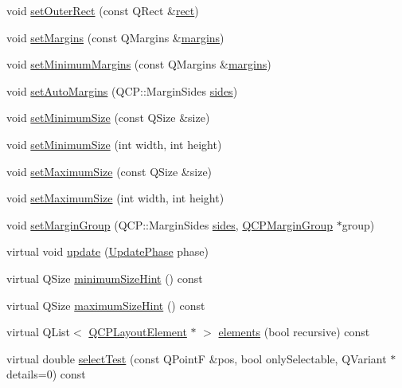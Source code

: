 \begin{DoxyCompactItemize}
\item 
void \hyperlink{class_q_c_p_layout_element_a38975ea13e36de8e53391ce41d94bc0f}{set\+Outer\+Rect} (const Q\+Rect \&\hyperlink{class_q_c_p_layout_element_affdfea003469aac3d0fac5f4e06171bc}{rect})
\item 
void \hyperlink{class_q_c_p_layout_element_a8f450b1f3f992ad576fce2c63d8b79cf}{set\+Margins} (const Q\+Margins \&\hyperlink{class_q_c_p_layout_element_a85ff977dfcced84eef32d9f819ec9543}{margins})
\item 
void \hyperlink{class_q_c_p_layout_element_a0a8a17abc16b7923159fcc7608f94673}{set\+Minimum\+Margins} (const Q\+Margins \&\hyperlink{class_q_c_p_layout_element_a85ff977dfcced84eef32d9f819ec9543}{margins})
\item 
void \hyperlink{class_q_c_p_layout_element_accfda49994e3e6d51ed14504abf9d27d}{set\+Auto\+Margins} (Q\+C\+P\+::\+Margin\+Sides \hyperlink{_v_s_a___u_t_2_comparision_pictures_2_createtest_image_8m_a2fd0c42bc0f9d36e00931ccceebc7087}{sides})
\item 
void \hyperlink{class_q_c_p_layout_element_a5dd29a3c8bc88440c97c06b67be7886b}{set\+Minimum\+Size} (const Q\+Size \&size)
\item 
void \hyperlink{class_q_c_p_layout_element_a8e0447614a0bf92de9a7304588c6b96e}{set\+Minimum\+Size} (int width, int height)
\item 
void \hyperlink{class_q_c_p_layout_element_a74eb5280a737ab44833d506db65efd95}{set\+Maximum\+Size} (const Q\+Size \&size)
\item 
void \hyperlink{class_q_c_p_layout_element_a03e0e9c48f230217c529b0819f832d84}{set\+Maximum\+Size} (int width, int height)
\item 
void \hyperlink{class_q_c_p_layout_element_a516e56f76b6bc100e8e71d329866847d}{set\+Margin\+Group} (Q\+C\+P\+::\+Margin\+Sides \hyperlink{_v_s_a___u_t_2_comparision_pictures_2_createtest_image_8m_a2fd0c42bc0f9d36e00931ccceebc7087}{sides}, \hyperlink{class_q_c_p_margin_group}{Q\+C\+P\+Margin\+Group} $\ast$group)
\item 
virtual void \hyperlink{class_q_c_p_layout_element_a929c2ec62e0e0e1d8418eaa802e2af9b}{update} (\hyperlink{class_q_c_p_layout_element_a0d83360e05735735aaf6d7983c56374d}{Update\+Phase} phase)
\item 
virtual Q\+Size \hyperlink{class_q_c_p_layout_element_aebe14fb71f858c0f98caf8d342a9864a}{minimum\+Size\+Hint} () const 
\item 
virtual Q\+Size \hyperlink{class_q_c_p_layout_element_adbd3a00fec44c977150c6be7329eb801}{maximum\+Size\+Hint} () const 
\item 
virtual Q\+List$<$ \hyperlink{class_q_c_p_layout_element}{Q\+C\+P\+Layout\+Element} $\ast$ $>$ \hyperlink{class_q_c_p_layout_element_a311d60d78e62ef8eaaedb1b6ceb9e788}{elements} (bool recursive) const 
\item 
virtual double \hyperlink{class_q_c_p_layout_element_a9fcf5d0ea19f2c23b2b528bce2c6f095}{select\+Test} (const Q\+Point\+F \&pos, bool only\+Selectable, Q\+Variant $\ast$details=0) const 
\end{DoxyCompactItemize}
